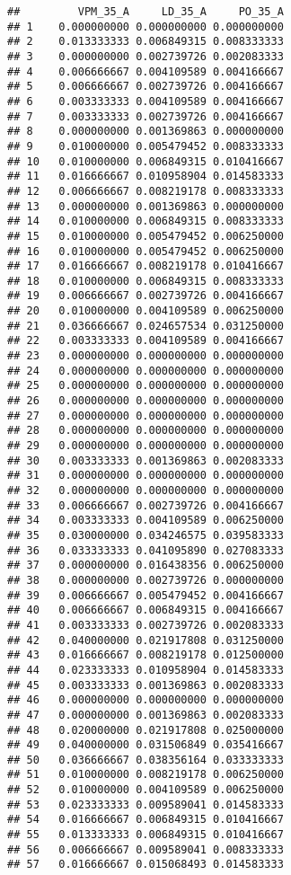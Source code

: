 \documentclass[
]{article}
\begin{document}
\begin{verbatim}
##         VPM_35_A     LD_35_A     PO_35_A
## 1    0.000000000 0.000000000 0.000000000
## 2    0.013333333 0.006849315 0.008333333
## 3    0.000000000 0.002739726 0.002083333
## 4    0.006666667 0.004109589 0.004166667
## 5    0.006666667 0.002739726 0.004166667
## 6    0.003333333 0.004109589 0.004166667
## 7    0.003333333 0.002739726 0.004166667
## 8    0.000000000 0.001369863 0.000000000
## 9    0.010000000 0.005479452 0.008333333
## 10   0.010000000 0.006849315 0.010416667
## 11   0.016666667 0.010958904 0.014583333
## 12   0.006666667 0.008219178 0.008333333
## 13   0.000000000 0.001369863 0.000000000
## 14   0.010000000 0.006849315 0.008333333
## 15   0.010000000 0.005479452 0.006250000
## 16   0.010000000 0.005479452 0.006250000
## 17   0.016666667 0.008219178 0.010416667
## 18   0.010000000 0.006849315 0.008333333
## 19   0.006666667 0.002739726 0.004166667
## 20   0.010000000 0.004109589 0.006250000
## 21   0.036666667 0.024657534 0.031250000
## 22   0.003333333 0.004109589 0.004166667
## 23   0.000000000 0.000000000 0.000000000
## 24   0.000000000 0.000000000 0.000000000
## 25   0.000000000 0.000000000 0.000000000
## 26   0.000000000 0.000000000 0.000000000
## 27   0.000000000 0.000000000 0.000000000
## 28   0.000000000 0.000000000 0.000000000
## 29   0.000000000 0.000000000 0.000000000
## 30   0.003333333 0.001369863 0.002083333
## 31   0.000000000 0.000000000 0.000000000
## 32   0.000000000 0.000000000 0.000000000
## 33   0.006666667 0.002739726 0.004166667
## 34   0.003333333 0.004109589 0.006250000
## 35   0.030000000 0.034246575 0.039583333
## 36   0.033333333 0.041095890 0.027083333
## 37   0.000000000 0.016438356 0.006250000
## 38   0.000000000 0.002739726 0.000000000
## 39   0.006666667 0.005479452 0.004166667
## 40   0.006666667 0.006849315 0.004166667
## 41   0.003333333 0.002739726 0.002083333
## 42   0.040000000 0.021917808 0.031250000
## 43   0.016666667 0.008219178 0.012500000
## 44   0.023333333 0.010958904 0.014583333
## 45   0.003333333 0.001369863 0.002083333
## 46   0.000000000 0.000000000 0.000000000
## 47   0.000000000 0.001369863 0.002083333
## 48   0.020000000 0.021917808 0.025000000
## 49   0.040000000 0.031506849 0.035416667
## 50   0.036666667 0.038356164 0.033333333
## 51   0.010000000 0.008219178 0.006250000
## 52   0.010000000 0.004109589 0.006250000
## 53   0.023333333 0.009589041 0.014583333
## 54   0.016666667 0.006849315 0.010416667
## 55   0.013333333 0.006849315 0.010416667
## 56   0.006666667 0.009589041 0.008333333
## 57   0.016666667 0.015068493 0.014583333

\end{verbatim}
\end{document}
